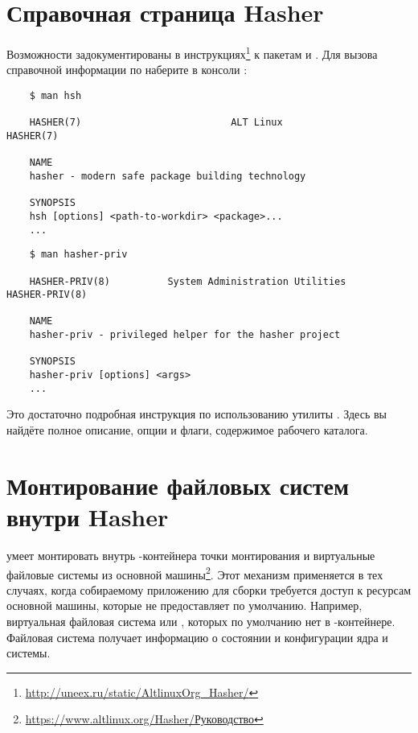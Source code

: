 \section{Справочная страница Hasher}
Возможности  задокументированы в инструкциях\footnote{\href{http://uneex.ru/static/AltlinuxOrg_Hasher/}{http://uneex.ru/static/AltlinuxOrg\_Hasher/}} к пакетам  и . Для вызова справочной информации по  наберите в консоли :
\begin{verbatim}
	$ man hsh
	
	HASHER(7)                          ALT Linux                         HASHER(7)
	
	NAME
	hasher - modern safe package building technology
	
	SYNOPSIS
	hsh [options] <path-to-workdir> <package>...
	...
\end{verbatim} 

\begin{verbatim}
	$ man hasher-priv
	
	HASHER-PRIV(8)          System Administration Utilities         HASHER-PRIV(8)
	
	NAME
	hasher-priv - privileged helper for the hasher project
	
	SYNOPSIS
	hasher-priv [options] <args>
	...
\end{verbatim}

Это достаточно подробная инструкция по использованию утилиты . Здесь вы найдёте полное описание, опции и флаги, содержимое рабочего каталога. 


\section{Монтирование файловых систем внутри Hasher}
 умеет монтировать внутрь -контейнера точки монтирования и виртуальные файловые системы из основной машины\footnote{\href{https://www.altlinux.org/Hasher/\%D0\%A0\%D1\%83\%D0\%BA\%D0\%BE\%D0\%B2\%D0\%BE\%D0\%B4\%D1\%81\%D1\%82\%D0\%B2\%D0\%BE\#\%D0\%9C\%D0\%BE\%D0\%BD\%D1\%82\%D0\%B8\%D1\%80\%D0\%BE\%D0\%B2\%D0\%B0\%D0\%BD\%D0\%B8\%D0\%B5_\%D1\%84\%D0\%B0\%D0\%B9\%D0\%BB\%D0\%BE\%D0\%B2\%D1\%8B\%D1\%85_\%D1\%81\%D0\%B8\%D1\%81\%D1\%82\%D0\%B5\%D0\%BC_\%D0\%B2\%D0\%BD\%D1\%83\%D1\%82\%D1\%80\%D0\%B8_hasher}{https://www.altlinux.org/Hasher/Руководство}}. Этот механизм применяется в тех случаях, когда собираемому приложению для сборки требуется доступ к ресурсам основной машины, которые  не предоставляет по умолчанию. Например, виртуальная файловая система  или , которых по умолчанию нет в -контейнере. Файловая система  получает информацию о состоянии и конфигурации ядра и системы.

